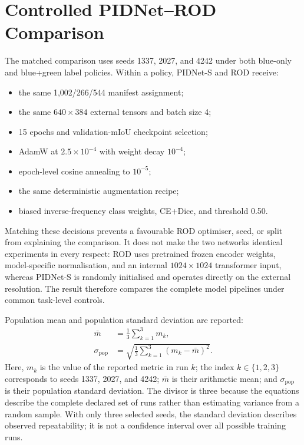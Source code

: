 \section{Controlled PIDNet--ROD Comparison}

The matched comparison uses seeds 1337, 2027, and 4242 under both blue-only and
blue+green label policies. Within a policy, PIDNet-S and ROD receive:
\begin{itemize}
  \item the same 1,002/266/544 manifest assignment;
  \item the same $640\times384$ external tensors and batch size 4;
  \item 15 epochs and validation-mIoU checkpoint selection;
  \item AdamW at $2.5\times10^{-4}$ with weight decay $10^{-4}$;
  \item epoch-level cosine annealing to $10^{-5}$;
  \item the same deterministic augmentation recipe;
  \item biased inverse-frequency class weights, CE+Dice, and threshold 0.50.
\end{itemize}

Matching these decisions prevents a favourable ROD optimiser, seed, or split
from explaining the comparison. It does not make the two networks identical
experiments in every respect: ROD uses pretrained frozen encoder weights,
model-specific normalisation, and an internal $1024\times1024$ transformer input,
whereas PIDNet-S is randomly initialised and operates directly on the external
resolution. The result therefore compares the complete model pipelines under
common task-level controls.

Population mean and population standard deviation are reported:
\begin{align}
 \bar m &= \frac{1}{3}\sum_{k=1}^{3}m_k,\\
 \sigma_{\mathrm{pop}}
 &=\sqrt{\frac{1}{3}\sum_{k=1}^{3}(m_k-\bar m)^2}.
\end{align}
Here, $m_k$ is the value of the reported metric in run $k$; the index
$k\in\{1,2,3\}$ corresponds to seeds 1337, 2027, and 4242; $\bar m$ is their
arithmetic mean; and $\sigma_{\mathrm{pop}}$ is their population standard
deviation. The divisor is three because the equations describe the complete
declared set of runs rather than estimating variance from a random sample.
With only three selected seeds, the standard deviation describes observed
repeatability; it is not a confidence interval over all possible training
runs.

